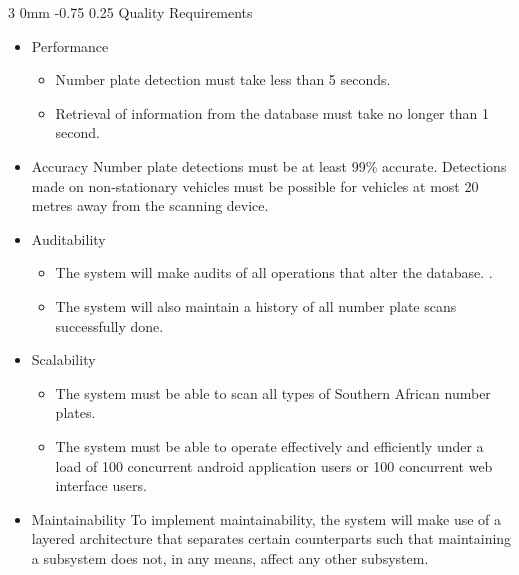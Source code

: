 \documentclass[12pt]{article}
\makeatletter
\renewcommand{\subsubsection}{\@startsection
   {subsubsection}%
   {3}%
   {0mm}%
   {-0.75\baselineskip}%
   {0.25\baselineskip}%
   {\rmfamily\normalfont\slshape\normalsize}}%
\makeatother
\begin{document}
                			\subsubsection{Quality Requirements}
                					\begin{itemize}
                							\item Performance
	                								\begin{itemize}
						   			                  		\item Number plate detection must take less than 5 seconds.
						   			                  		\item Retrieval of information from the database must take no longer than 1 second.
						   			                \end{itemize}
                								
                							\item Accuracy
			              							Number plate detections must be at least 99\% accurate. Detections made on non-stationary vehicles must be possible for vehicles at most 20 metres away from the scanning device.
               								
                							\item Auditability
		               								\begin{itemize}
		               									\item The system will make audits of all operations that alter the database. .
		               									\item The system will also maintain a history of all number plate scans successfully done.
		               								\end{itemize}
		               								
		               								
                							\item Scalability
                									\begin{itemize}
					       				                  	\item The system must be able to scan all types of Southern African number plates.
					       				                  	\item The system must be able to operate effectively and efficiently under a load of 100 concurrent android application users or 100 concurrent web interface users.
					       			                \end{itemize}
		               								
                							\item Maintainability
                									To implement maintainability, the system will make use of a layered architecture that separates certain counterparts such that maintaining a subsystem does not, in any means, affect any other subsystem.
		              								

\end{itemize}
\end{document}
